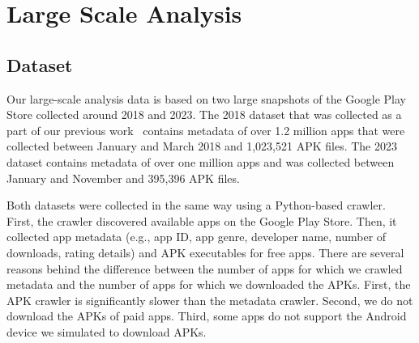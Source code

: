 \section{Large Scale Analysis}
\label{sec:large-scale-analysis}

\subsection{Dataset}
\label{subsec:dataset}

\begin{table*}[h]
\tiny
\caption{Number of APKs per year}
\label{tab:large-scale_dataset}
\end{table*}

Our large-scale analysis data is based on two large snapshots of the Google Play Store collected around 2018 and 2023. The 2018 dataset that was collected as a part of our previous work~\cite{karunanayake2020multi,rajasegaran2019multi} contains metadata of over 1.2 million apps that were collected between January and March 2018 and 1,023,521 APK files. The 2023 dataset contains metadata of over one million apps and was collected between January and November and 395,396 APK files.


Both datasets were collected in the same way using a Python-based crawler. First, the crawler discovered available apps on the Google Play Store. Then, it collected app metadata (e.g., app ID, app genre, developer name, number of downloads, rating details) and APK executables for free apps. There are several reasons behind the difference between the number of apps for which we crawled metadata and the number of apps for which we downloaded the APKs. First, the APK crawler is significantly slower than the metadata crawler. Second, we do not download the APKs of paid apps. Third, some apps do not support the Android device we simulated to download APKs.

